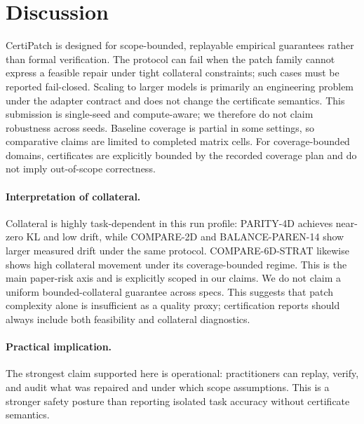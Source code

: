 \section{Discussion}
CertiPatch is designed for scope-bounded, replayable empirical guarantees rather than formal verification.
The protocol can fail when the patch family cannot express a feasible repair under tight collateral constraints; such cases must be reported fail-closed.
Scaling to larger models is primarily an engineering problem under the adapter contract and does not change the certificate semantics.
This submission is single-seed and compute-aware; we therefore do not claim robustness across seeds.
Baseline coverage is partial in some settings, so comparative claims are limited to completed matrix cells.
For coverage-bounded domains, certificates are explicitly bounded by the recorded coverage plan and do not imply out-of-scope correctness.

\paragraph{Interpretation of collateral.}
Collateral is highly task-dependent in this run profile: PARITY-4D achieves near-zero KL and low drift, while COMPARE-2D and BALANCE-PAREN-14 show larger measured drift under the same protocol.
COMPARE-6D-STRAT likewise shows high collateral movement under its coverage-bounded regime.
This is the main paper-risk axis and is explicitly scoped in our claims.
We do not claim a uniform bounded-collateral guarantee across specs.
This suggests that patch complexity alone is insufficient as a quality proxy; certification reports should always include both feasibility and collateral diagnostics.

\paragraph{Practical implication.}
The strongest claim supported here is operational: practitioners can replay, verify, and audit what was repaired and under which scope assumptions.
This is a stronger safety posture than reporting isolated task accuracy without certificate semantics.
